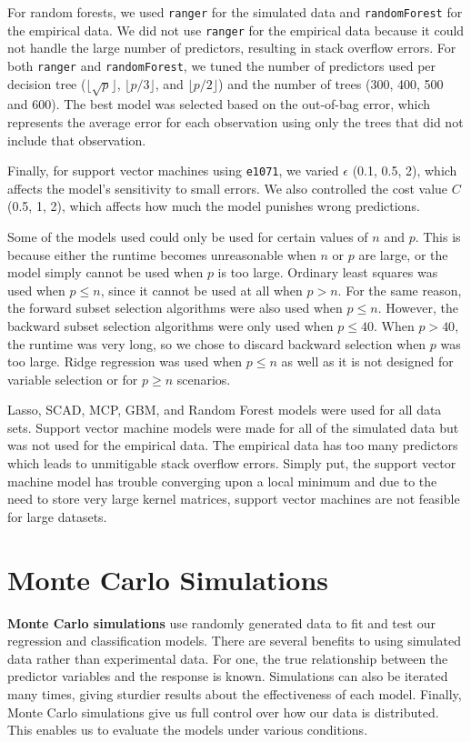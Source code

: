 \documentclass{article}
\begin{document}
For random forests, we used \lstinline!ranger! for the simulated data and \lstinline!randomForest! for the empirical data. We did not use \lstinline!ranger! for the empirical data because it could not handle the large number of predictors, resulting in stack overflow errors. For both \lstinline!ranger! and \lstinline!randomForest!, we tuned the number of predictors used per decision tree ($\lfloor \sqrt{p}\rfloor$, $\lfloor p / 3 \rfloor$, and $\lfloor p / 2 \rfloor$) and the number of trees (300, 400, 500 and 600). The best model was selected based on the out-of-bag error, which represents the average error for each observation using only the trees that did not include that observation.

Finally, for support vector machines using \lstinline!e1071!, we varied $\epsilon$ (0.1, 0.5, 2), which affects the model's sensitivity to small errors. We also controlled the cost value $C$ (0.5, 1, 2), which affects how much the model punishes wrong predictions.

Some of the models used could only be used for certain values of $n$ and $p$. This is because either the runtime becomes unreasonable when $n$ or $p$ are large, or the model simply cannot be used when $p$ is too large. Ordinary least squares was used when $p\leq n$, since it cannot be used at all when $p>n$. For the same reason, the forward subset selection algorithms were also used when $p\leq n$. However, the backward subset selection algorithms were only used when $p\leq 40$. When $p>40$, the runtime was very long, so we chose to discard backward selection when $p$ was too large. Ridge regression was used when $p\leq n$ as well as it is not designed for variable selection or for $p \geq n$ scenarios.

Lasso, SCAD, MCP, GBM, and Random Forest models were used for all data sets. Support vector machine models were made for all of the simulated data but was not used for the empirical data. The empirical data has too many predictors which leads to unmitigable stack overflow errors. Simply put, the support vector machine model has trouble converging upon a local minimum and due to the need to store very large kernel matrices, support vector machines are not feasible for large datasets.
\section{Monte Carlo Simulations}

\textbf{Monte Carlo simulations} use randomly generated data to fit and test our regression and classification models. There are several benefits to using simulated data rather than experimental data. For one, the true relationship between the predictor variables and the response is known. Simulations can also be iterated many times, giving sturdier results about the effectiveness of each model. Finally, Monte Carlo simulations give us full control over how our data is distributed. This enables us to evaluate the models under various conditions.
\end{document}
